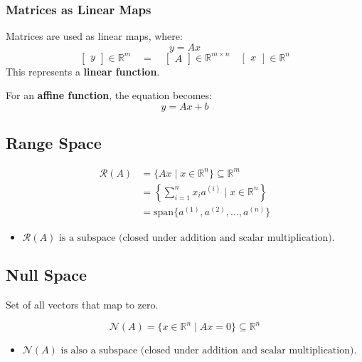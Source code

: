     \subsubsection{Matrices as Linear Maps}
    \begin{definition}
        Matrices are used as linear maps, where:
        \[
        y = A x
        \]
        \[
        \begin{bmatrix} y \end{bmatrix} \in \mathbb{R}^m \quad = \quad \begin{bmatrix} A \end{bmatrix} \in \mathbb{R}^{m \times n} \quad \begin{bmatrix} x \end{bmatrix} \in \mathbb{R}^n
        \]
        This represents a \textbf{linear function}.
        \vspace{1em}

        For an \textbf{affine function}, the equation becomes:
        \[
        y = A x + b
        \]
    \end{definition}

\subsection{Range Space}
    \begin{definition}
        \begin{align}
            \mathcal{R}(A) &= \{Ax \mid x \in \mathbb{R}^n\} \subseteq \mathbb{R}^m \\
            &= \left\{ \sum_{i=1}^{n} x_i a^{(i)} \mid x \in \mathbb{R}^n \right\} \\ 
            &= \text{span} \{a^{(1)}, a^{(2)}, \dots, a^{(n)}\}
        \end{align}
        \begin{itemize}
            \item $\mathcal{R}(A) \text{ is a subspace (closed under addition and scalar multiplication).}$
        \end{itemize}

    \end{definition}

\subsection{Null Space}
    \begin{definition} 
    Set of all vectors that map to zero.

    \begin{equation}
        \mathcal{N}(A) = \{x \in \mathbb{R}^n \mid Ax = 0\} \subseteq \mathbb{R}^n
    \end{equation}

    \begin{itemize}
        \item $\mathcal{N}(A) \text{ is also a subspace (closed under addition and scalar multiplication).}$
    \end{itemize}
    \end{definition}

